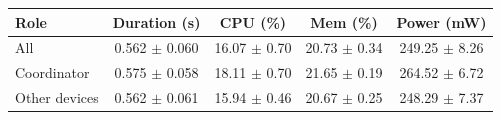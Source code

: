 \begin{tabular}{lcccc}
\hline
\textbf{Role} & \textbf{Duration (s)} & \textbf{CPU (\%)} & \textbf{Mem (\%)} & \textbf{Power (mW)} \\
\hline
All & 0.562 $\pm$ 0.060 & 16.07 $\pm$ 0.70 & 20.73 $\pm$ 0.34 & 249.25 $\pm$ 8.26 \\
Coordinator & 0.575 $\pm$ 0.058 & 18.11 $\pm$ 0.70 & 21.65 $\pm$ 0.19 & 264.52 $\pm$ 6.72 \\
Other devices & 0.562 $\pm$ 0.061 & 15.94 $\pm$ 0.46 & 20.67 $\pm$ 0.25 & 248.29 $\pm$ 7.37 \\
\hline
\end{tabular}
